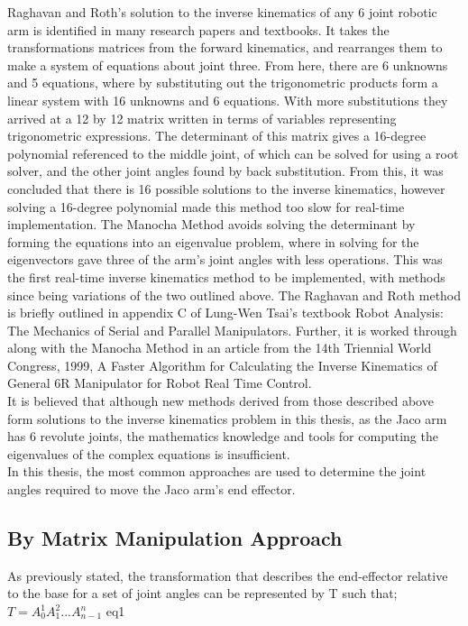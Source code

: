 \documentclass[12pt,openany,a4paper]{book}
\begin{document}
Raghavan and Roth's solution to the inverse kinematics of any 6 joint robotic arm is identified in many research papers and textbooks. It takes the transformations matrices from the forward kinematics, and rearranges them to make a system of equations about joint three. From here, there are 6 unknowns and 5 equations, where by substituting out the trigonometric products form a linear system with 16 unknowns and 6 equations. With more substitutions they arrived at a 12 by 12 matrix written in terms of variables representing trigonometric expressions. The determinant of this matrix gives a 16-degree polynomial referenced to the middle joint, of which can be solved for using a root solver, and the other joint angles found by back substitution. From this, it was concluded that there is 16 possible solutions to the inverse kinematics, however solving a 16-degree polynomial made this method too slow for real-time implementation. The Manocha Method avoids solving the determinant by forming the equations into an eigenvalue problem, where in solving for the eigenvectors gave three of the arm's joint angles with less operations. This was the first real-time inverse kinematics method to be implemented, with methods since being variations of the two outlined above. The Raghavan and Roth method is briefly outlined in appendix C of Lung-Wen Tsai's textbook Robot Analysis: The Mechanics of Serial and Parallel Manipulators. Further, it is worked through along with the Manocha Method in an article from the 14th Triennial World Congress, 1999, A Faster Algorithm for Calculating the Inverse Kinematics of General 6R Manipulator for Robot Real Time Control.\\
It is believed that although new methods derived from those described above form solutions to the inverse kinematics problem in this thesis, as the Jaco arm has 6 revolute joints, the mathematics knowledge and tools for computing the eigenvalues of the complex equations is insufficient.\\


In this thesis, the most common approaches are used to determine the joint angles required to move the Jaco arm's end effector. %

\subsection{By Matrix Manipulation Approach}
As previously stated, the transformation that describes the end-effector relative to the base for a set of joint angles can be represented by T such that;
 $T = A_{0}^{1} A_{1}^{2} ... A_{n-1}^n$	eq1
 
\end{document}
